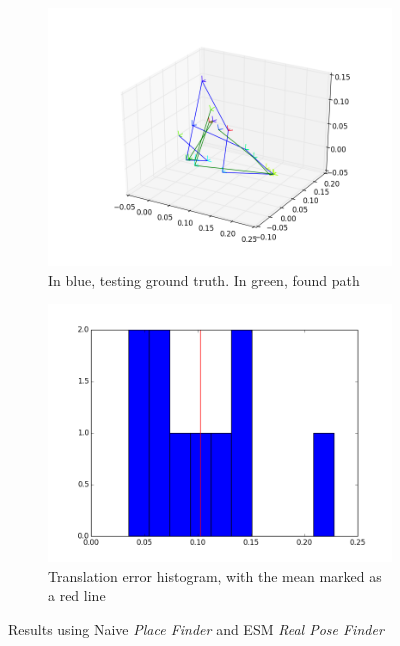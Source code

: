 \begin{figure}[htpb]
  \begin{subfigure}[b]{6cm}
          \includegraphics[width=\linewidth]{img/desktop_2_naive_esm_path_1.png}
          \caption{In blue, testing ground truth. In green, found path}                
          \label{fig:desktop_2_naive_esm_path_1}
  \end{subfigure}   
  \qquad
  \begin{subfigure}[b]{6cm}
          \includegraphics[width=\linewidth]{img/desktop_2_naive_esm_dist_1.png}
          \caption{Translation error histogram, with the mean marked as a red line}                
          \label{fig:desktop_2_naive_esm_dist_1}
  \end{subfigure}
  \caption{Results using Naive \textit{Place Finder} and ESM  \textit{Real Pose Finder}}
\end{figure}


